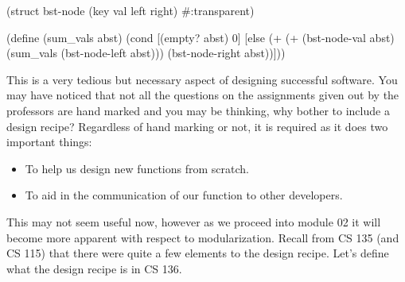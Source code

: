 
\begin{code}[Lisp]
(struct bst-node (key val left right) #:transparent)

(define (sum_vals abst)
	(cond
		[(empty? abst) 0]
		[else (+ (+ (bst-node-val abst) (sum_vals (bst-node-left abst))) 
		         (bst-node-right abst))]))
\end{code}



This is a very tedious but necessary aspect of designing successful software. You may have noticed that not all the questions on the assignments given out by the professors are hand marked and you may be thinking, why bother to include a design recipe? Regardless of hand marking or not, it is required as it does two important things:

\begin{itemize}

\item To help us design new functions from scratch.
\item To aid in the communication of our function to other developers.

\end{itemize}

This may not seem useful now, however as we proceed into module 02 it will become more apparent with respect to modularization. Recall from CS 135 (and CS 115) that there were quite a few elements to the design recipe. Let's define what the design recipe is in CS 136.\\


